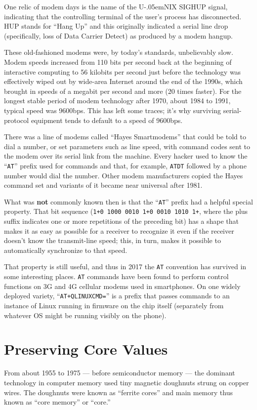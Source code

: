 \documentclass[10pt]{article}
\newcommand{\hexnum}[1]{\texttt{#1}}
\newcommand{\mc}{\small}
\newcommand{\acro}[1]{{\mc #1\spacefactor1000}}
\def\UNIX/{{\mc U\kern-.05emNIX\spacefactor1000}}%
\begin{document}
One relic of modem days is the name of the \UNIX/ \acro{SIGHUP} signal, indicating that
the controlling terminal of the user's process has disconnected. \acro{HUP} stands for
``Hang Up'' and this originally indicated a serial line drop (specifically, loss
of Data Carrier Detect) as produced by a modem hangup.

These old-fashioned modems were, by today's standards, unbelievably slow. Modem
speeds increased from 110 bits per second back at the beginning of interactive
computing to 56 kilobits per second just before the technology was effectively
wiped out by wide-area Internet around the end of the 1990s, which brought in
speeds of a megabit per second and more (20 times faster). For the longest
stable period of modem technology after 1970, about 1984 to 1991, typical speed
was 9600bps. This has left some traces; it's why surviving serial-protocol
equipment tends to default to a speed of 9600bps.

There was a line of modems called ``Hayes Smartmodems'' that could be told to
dial a number, or set parameters such as line speed, with command codes sent to
the modem over its serial link from the machine. Every hacker used to know the
``\texttt{AT}'' prefix used for commands and that, for example, \texttt{ATDT} followed by a phone
number would dial the number. Other modem manufacturers copied the Hayes
command set and variants of it became near universal after 1981.

What was \textbf{not} commonly known then is that the ``{\tt AT}'' prefix had a helpful special
property. That bit sequence (\hexnum{1+0 1000 0010 1+0 0010 1010 1+}, where the plus
suffix indicates one or more repetitions of the preceding bit) has a shape that
makes it as easy as possible for a receiver to recognize it even if the
receiver doesn't know the transmit-line speed; this, in turn, makes it possible
to automatically synchronize to that speed.

That property is still useful, and thus in 2017 the \texttt{AT} convention has survived
in some interesting places. \texttt{AT} commands have been found to perform control
functions on 3G and 4G cellular modems used in smartphones. On one widely
deployed variety, ``\texttt{AT+QLINUXCMD=}'' is a prefix that passes commands to an
instance of Linux running in firmware on the chip itself (separately from
whatever \acro{OS} might be running visibly on the phone).

\section{Preserving Core Values}
From about 1955 to 1975 --- before semiconductor memory --- the dominant technology
in computer memory used tiny magnetic doughnuts strung on copper wires. The
doughnuts were known as ``ferrite cores'' and main memory thus known as ``core
memory'' or ``core.''
\end{document}
